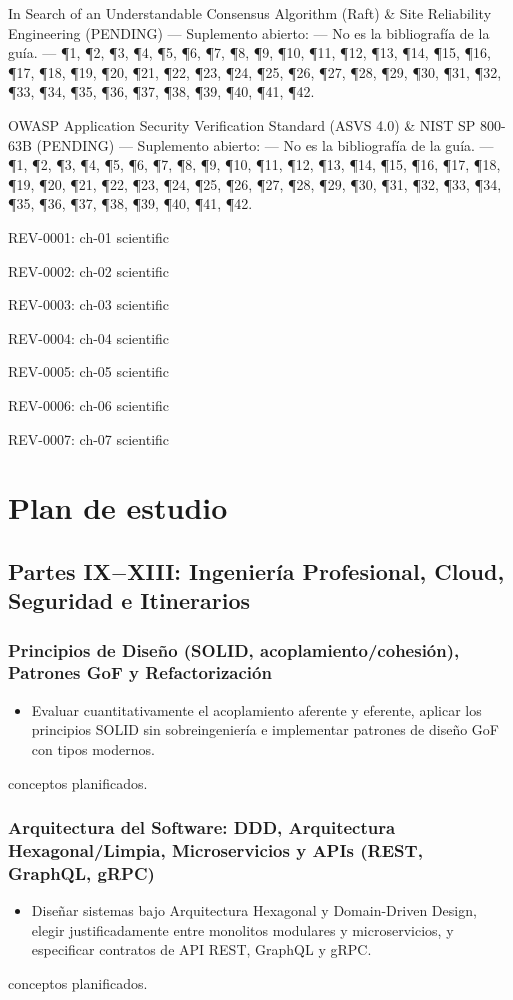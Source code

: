 \documentclass{book}
\begin{document}
\noindent In Search of an Understandable Consensus Algorithm (Raft) \& Site Reliability Engineering (PENDING) --- Suplemento abierto: --- No es la bibliografía de la guía. --- \P1, \P2, \P3, \P4, \P5, \P6, \P7, \P8, \P9, \P10, \P11, \P12, \P13, \P14, \P15, \P16, \P17, \P18, \P19, \P20, \P21, \P22, \P23, \P24, \P25, \P26, \P27, \P28, \P29, \P30, \P31, \P32, \P33, \P34, \P35, \P36, \P37, \P38, \P39, \P40, \P41, \P42.

\noindent OWASP Application Security Verification Standard (ASVS 4.0) \& NIST SP 800-63B (PENDING) --- Suplemento abierto: --- No es la bibliografía de la guía. --- \P1, \P2, \P3, \P4, \P5, \P6, \P7, \P8, \P9, \P10, \P11, \P12, \P13, \P14, \P15, \P16, \P17, \P18, \P19, \P20, \P21, \P22, \P23, \P24, \P25, \P26, \P27, \P28, \P29, \P30, \P31, \P32, \P33, \P34, \P35, \P36, \P37, \P38, \P39, \P40, \P41, \P42.

\noindent REV-0001: ch-01 scientific

\noindent REV-0002: ch-02 scientific

\noindent REV-0003: ch-03 scientific

\noindent REV-0004: ch-04 scientific

\noindent REV-0005: ch-05 scientific

\noindent REV-0006: ch-06 scientific

\noindent REV-0007: ch-07 scientific
\chapter{Plan de estudio}

\section*{Partes IX\(-\)XIII: Ingeniería Profesional, Cloud, Seguridad e Itinerarios}

\subsection*{\checkmark Principios de Diseño (SOLID, acoplamiento/cohesión), Patrones GoF y Refactorización}
\begin{itemize}
\item Evaluar cuantitativamente el acoplamiento aferente y eferente, aplicar los principios SOLID sin sobreingeniería e implementar patrones de diseño GoF con tipos modernos.
\end{itemize}
 conceptos planificados.

\subsection*{\checkmark Arquitectura del Software: DDD, Arquitectura Hexagonal/Limpia, Microservicios y APIs (REST, GraphQL, gRPC)}
\begin{itemize}
\item Diseñar sistemas bajo Arquitectura Hexagonal y Domain-Driven Design, elegir justificadamente entre monolitos modulares y microservicios, y especificar contratos de API REST, GraphQL y gRPC.
\end{itemize}
 conceptos planificados.
\end{document}
